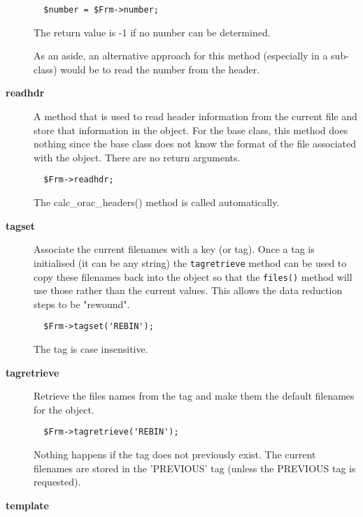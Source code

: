 \begin{description}
\begin{verbatim}
  $number = $Frm->number;
\end{verbatim}


The return value is -1 if no number can be determined.



As an aside, an alternative approach for this method (especially
in a sub-class) would be to read the number from the header.

\item[\textbf{readhdr}] \mbox{}

A method that is used to read header information from the current
file and store that information in the object. For the base class,
this method does nothing since the base class does not know 
the format of the file associated with the object. There are
no return arguments.

\begin{verbatim}
  $Frm->readhdr;
\end{verbatim}


The calc\_orac\_headers() method is called automatically.

\item[\textbf{tagset}] \mbox{}

Associate the current filenames with a key (or tag). Once a tag
is initialised (it can be any string) the \texttt{tagretrieve} method
can be used to copy these filenames back into the object so that
the \texttt{files()} method will use those rather than the current
values. This allows the data reduction steps to be "rewound".

\begin{verbatim}
  $Frm->tagset('REBIN');
\end{verbatim}


The tag is case insensitive.

\item[\textbf{tagretrieve}] \mbox{}

Retrieve the files names from the tag and make them the default
filenames for the object.

\begin{verbatim}
  $Frm->tagretrieve('REBIN');
\end{verbatim}


Nothing happens if the tag does not previously exist.
The current filenames are stored in the 'PREVIOUS' tag (unless the
PREVIOUS tag is requested).

\item[\textbf{template}] \mbox{}


\end{description}

